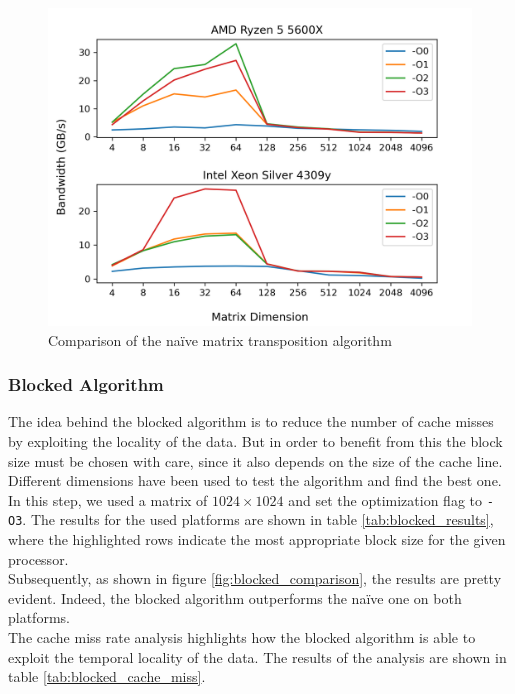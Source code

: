 \documentclass{IEEEconf}
\begin{document}
\begin{figure}
    \centering
    \includegraphics[scale=0.8]{report/img/naive_comparison.png}
    \caption{Comparison of the na\"{i}ve matrix transposition algorithm}
    \label{fig:naive_comparison}
\end{figure}
\subsubsection{Blocked Algorithm}
The idea behind the blocked algorithm is to reduce the number of cache misses by exploiting the locality of the data. But in order to benefit from this the block
size must be chosen with care, since it also depends on the size of the cache line. Different dimensions have been used to test the algorithm and find the best one.
In this step, we used a matrix of $1024 \times 1024$ and set the optimization flag to \texttt{-O3}.
The results for the used platforms are shown in table \ref{tab:blocked_results}, where the highlighted rows indicate the most appropriate 
block size for the given processor. \\
Subsequently, as shown in figure \ref{fig:blocked_comparison}, the results are pretty evident. Indeed, the blocked algorithm outperforms the na\"{i}ve one on both platforms. \\
The cache miss rate analysis highlights how the blocked algorithm is able to exploit the temporal locality of the data.
The results of the analysis are shown in table \ref{tab:blocked_cache_miss}. \\
\end{document}
